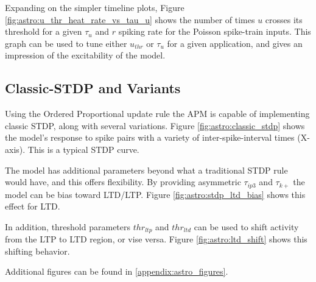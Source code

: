     Expanding on the simpler timeline plots, Figure
    \ref{fig:astro:u_thr_heat_rate_vs_tau_u} shows the number of times $u$ crosses its
    threshold for a given $\tau_u$ and $r$ spiking rate for the Poisson
    spike-train inputs. This graph can be used to tune either $u_{thr}$ or
    $\tau_u$ for a given application, and gives an impression of the
    excitability of the model.


    \subsection{Classic-STDP and Variants} \label{sec:ordered_prop:stdp}
    
    Using the Ordered Proportional update rule the APM is capable of
    implementing classic STDP, along with several variations.  
    Figure \ref{fig:astro:classic_stdp} shows the model's response to spike
    pairs with a variety of inter-spike-interval times (X-axis). This is a
    typical STDP curve.


    The model has additional parameters beyond what a traditional STDP rule would
    have, and this offers flexibility. By providing asymmetric $\tau_{ip3}$ and
    $\tau_{k+}$ the model can be bias toward LTD/LTP. Figure
    \ref{fig:astro:stdp_ltd_bias} shows this effect for LTD.


    In addition, threshold parameters $thr_{ltp}$ and $thr_{ltd}$ can be used to
    shift activity from the LTP to LTD region, or vise versa. Figure
    \ref{fig:astro:ltd_shift} shows this shifting behavior.
    

    Additional figures can be found in \ref{appendix:astro_figures}.

